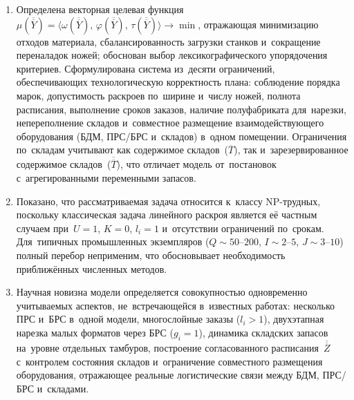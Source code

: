 \begin{enumerate}
  \item Определена векторная целевая функция $\mu(\overline{\overline{Y}})=\langle\omega(\overline{\overline{Y}}),\,\varphi(\overline{\overline{Y}}),\,\tau(\overline{\overline{Y}})\rangle\to\min$, отражающая минимизацию отходов материала, сбалансированность загрузки станков и~сокращение переналадок ножей; обоснован выбор лексикографического упорядочения критериев.
  Сформулирована система из~десяти ограничений, обеспечивающих технологическую корректность плана: соблюдение порядка марок, допустимость раскроев по~ширине и~числу ножей, полнота расписания, выполнение сроков заказов, наличие полуфабриката для~нарезки, непереполнение складов и~совместное размещение взаимодействующего оборудования (БДМ, ПРС/БРС и~складов) в~одном помещении.
  Ограничения по~складам учитывают как содержимое складов~($\overline{T}$), так и~зарезервированное содержимое складов~($\overline{\overline{T}}$), что отличает модель от~постановок с~агрегированными переменными запасов.

  \item Показано, что рассматриваемая задача относится к~классу NP-трудных, поскольку классическая задача линейного раскроя является её частным случаем при~$U=1$, $K=0$, $l_i=1$ и~отсутствии ограничений по~срокам.
  Для~типичных промышленных экземпляров ($Q\sim 50$--$200$, $I\sim 2$--$5$, $J\sim 3$--$10$) полный перебор неприменим, что обосновывает необходимость приближённых численных методов.

  \item Научная новизна модели определяется совокупностью одновременно учитываемых аспектов, не~встречающейся в~известных работах: несколько ПРС и~БРС в~одной модели, многослойные заказы ($l_i>1$), двухэтапная нарезка малых форматов через БРС ($g_i=1$), динамика складских запасов на~уровне отдельных тамбуров, построение согласованного расписания~$\overline{\overline{Z}}$ с~контролем состояния складов и~ограничение совместного размещения оборудования, отражающее реальные логистические связи между БДМ, ПРС/БРС и~складами.


\end{enumerate}
